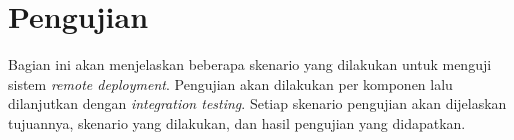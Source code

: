 \section{Pengujian}

Bagian ini akan menjelaskan beberapa skenario yang dilakukan untuk menguji sistem \textit{remote deployment}. Pengujian akan dilakukan per komponen lalu dilanjutkan dengan \textit{integration testing}. Setiap skenario pengujian akan dijelaskan tujuannya, skenario yang dilakukan, dan hasil pengujian yang didapatkan.

% 
% 
% 
% 
% 




